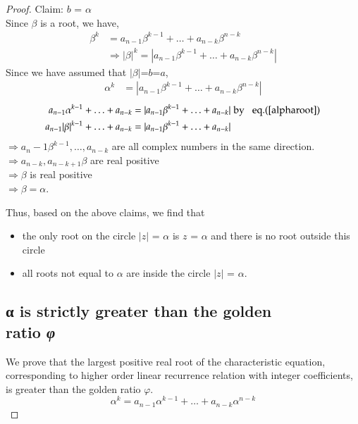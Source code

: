 \begin{multicols}{2}
\begin{proof}
Claim: $b$ = $\alpha$ \\
Since $\beta$ is a root, we have,
\begin{align}
\beta^k &= a_{n-1}\beta^{k-1} + \ldots + a_{n-k}\beta^{n-k}\nonumber\\
&\Rightarrow |\beta|^k = |a_{n-1}\beta^{k-1} + \ldots + a_{n-k}\beta^{n-k}|\nonumber
\end{align}
Since we have assumed that $|\beta|$=$b$=$a$, 
\begin{align*}
\alpha^k &= |a_{n-1}\beta^{k-1}+ \ldots + a_{n-k}\beta^{n-k}|
\end{align*}
{\fontsize{8}{9}\selectfont\begin{align}
a_{n-1}\alpha^{k-1}+ \ldots + a_{n-k} &=  |a_{n-1}\beta^{k-1}+ \ldots + a_{n-k}| \hspace{0.1cm}\textup{by \hspace{0.1cm} eq.(\ref{alpharoot})} \label{eq-11.9}\\
a_{n-1}|\beta|^{k-1}+ \ldots + a_{n-k} &=  |a_{n-1}\beta^{k-1}+ \ldots + a_{n-k}|\label{eq-11.10}
\end{align}}
$\Rightarrow a_n-1\beta^{k-1}, \ldots, a_{n-k}$ are all complex numbers in the same direction. \\
$\Rightarrow a_{n-k}, a_{n-k+1} \beta$ are real positive\\
$\Rightarrow \beta$ is real positive\\
$\Rightarrow \beta = \alpha$.\\

\vspace{-.6cm}

Thus, based on the above claims, we find that 
\begin{itemize}
\item the only root on the circle $|z|$ = $\alpha$ is $z$ = $\alpha$ and there is no root outside this circle
\item all roots not equal to $\alpha$ are inside the circle $|z|$ = $\alpha$.
\end{itemize}

\subsection{{\greekfont α} is strictly greater than the golden\\ ratio  {\it {\greekfont φ}}}\label{subsection-11.3}
We prove that the largest positive real root of the characteristic equation, corresponding to higher order linear recurrence relation with integer coefficients, is greater than the golden ratio $\varphi$.
$$
\alpha^{k} =  a_{n-1}\alpha^{k-1} + \ldots + a_{n-k}\alpha^{n-k}
$$


\end{proof}
\end{multicols}
